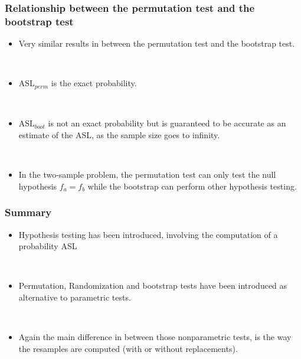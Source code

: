 \frame
{
\frametitle{Relationship between the permutation test and the bootstrap test}

\begin{itemize}
\item Very similar results in between the permutation test and the bootstrap test.


\


\item $\mathrm{ASL}_{perm}$ is the exact probability.   

\

\item $\mathrm{ASL}_{boot}$ is not an exact probability but is guaranteed to be accurate as an estimate of the ASL, as the sample size goes to infinity.

\

\item In the two-sample problem, the permutation test can  only test the null hypothesis $f_a=f_b$ while the bootstrap can perform other hypothesis testing.  


\end{itemize}

}





\frame
{
\frametitle{Summary}

\begin{itemize}

\item Hypothesis testing has been introduced, involving the computation of a probability ASL

\

\item Permutation, Randomization  and bootstrap tests have been introduced as alternative to parametric tests.

\

\item Again the main difference in between those nonparametric tests, is the way the resamples are computed (with or without replacements).

\end{itemize}


}
